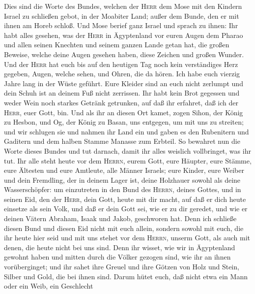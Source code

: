  Dies sind die Worte des Bundes, welchen der \textsc{Herr}
dem Mose mit den Kindern Israel zu schließen gebot, in der Moabiter
Land; außer dem Bunde, den er mit ihnen am Horeb schloß. 
Und Mose berief ganz Israel und sprach zu ihnen: Ihr habt alles gesehen,
was der \textsc{Herr} in Ägyptenland vor euren Augen dem Pharao und
allen seinen Knechten und seinem ganzen Lande getan hat, 
die großen Beweise, welche deine Augen gesehen haben, diese Zeichen und
großen Wunder.  Und der \textsc{Herr} hat euch bis auf den
heutigen Tag noch kein verständiges Herz gegeben, Augen, welche sehen,
und Ohren, die da hören.  Ich habe euch vierzig Jahre lang
in der Wüste geführt. Eure Kleider sind an euch nicht zerlumpt und dein
Schuh ist an deinem Fuß nicht zerrissen.  Ihr habt kein
Brot gegessen und weder Wein noch starkes Getränk getrunken, auf daß ihr
erfahret, daß ich der \textsc{Herr}, euer Gott, bin.  Und
als ihr an diesen Ort kamet, zogen Sihon, der König zu Hesbon, und Og,
der König zu Basan, uns entgegen, um mit uns zu streiten; 
und wir schlugen sie und nahmen ihr Land ein und gaben es den Rubenitern
und Gaditern und dem halben Stamme Manasse zum Erbteil. 
So bewahret nun die Worte dieses Bundes und tut darnach, damit ihr alles
weislich vollbringet, was ihr tut.  Ihr alle steht heute
vor dem \textsc{Herrn}, eurem Gott, eure Häupter, eure Stämme, eure
Ältesten und eure Amtleute, alle Männer Israels;  eure
Kinder, eure Weiber und dein Fremdling, der in deinem Lager ist, deine
Holzhauer sowohl als deine Wasserschöpfer:  um
einzutreten in den Bund des \textsc{Herrn}, deines Gottes, und in seinen
Eid, den der \textsc{Herr}, dein Gott, heute mit dir macht,
 auf daß er dich heute einsetze als sein Volk, und daß er
dein Gott sei, wie er zu dir geredet, und wie er deinen Vätern Abraham,
Isaak und Jakob, geschworen hat.  Denn ich schließe
diesen Bund und diesen Eid nicht mit euch allein, 
sondern sowohl mit euch, die ihr heute hier seid und mit uns stehet vor
dem \textsc{Herrn}, unserm Gott, als auch mit denen, die heute nicht bei
uns sind.  Denn ihr wisset, wie wir in Ägyptenland
gewohnt haben und mitten durch die Völker gezogen sind, wie ihr an ihnen
vorüberginget;  und ihr sahet ihre Greuel und ihre Götzen
von Holz und Stein, Silber und Gold, die bei ihnen sind. 
Darum hütet euch, daß nicht etwa ein Mann oder ein Weib, ein Geschlecht
